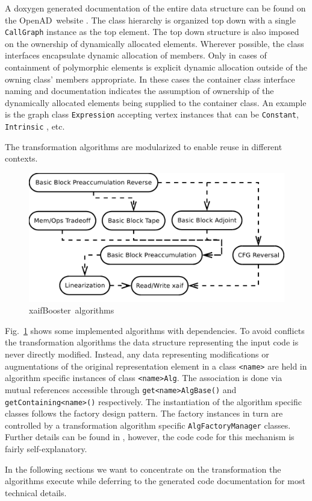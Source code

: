 \documentclass{book}
\newcommand{\OpenAD}{OpenAD}
\newcommand{\xaifBooster}{xaifBooster}
\newcommand{\code}[1]{{\small\tt{#1}}}
\newcommand{\reffig}[1]{{Fig.~\ref{#1}}}
\begin{document}
A doxygen generated documentation of the entire data structure 
can be found on the \OpenAD\ website \cite{openadWeb}.
The class hierarchy is organized top down with 
a single \code{CallGraph} instance as the top element. 
The top down structure is also imposed on the ownership of dynamically 
allocated elements. 
Wherever possible, the class interfaces encapsulate dynamic 
allocation of members.  
Only in cases of containment of polymorphic elements is explicit dynamic allocation 
outside of the owning class' members appropriate. 
In these cases the container class interface naming and documentation 
indicates the assumption of ownership of 
the dynamically allocated elements being supplied to the container class. 
An example is the graph class \code{Expression} accepting vertex instances that can be 
\code{Constant}, \code{Intrinsic} , etc.

The transformation algorithms are modularized to enable reuse in different 
contexts. 
\begin{figure}
  \centering \includegraphics[width=.45\textwidth]{allAlgs}
  \caption{\xaifBooster\ algorithms} \label{fig:allAlgs}
\end{figure}
\reffig{fig:allAlgs} shows some implemented algorithms with dependencies.
To avoid conflicts the transformation algorithms the data structure representing the input code  
is never directly modified. 
Instead, any data representing modifications or augmentations of the 
original representation element in a class \code{<name>}
are held in algorithm specific instances of class \code{<name>Alg}.
The association is done via mutual references accessible 
through \code{get<name>AlgBase()} and \code{getContaining<name>()} respectively.
The instantiation of the algorithm specific classes follows 
the factory design pattern. The factory instances in turn are controlled 
by a transformation algorithm specific \code{AlgFactoryManager} classes. 
Further details can be found in \cite{UtNa03STI}, however, the code 
code for this mechanism is fairly self-explanatory.  

In the following sections we want to concentrate on the transformation 
the algorithms execute while deferring to the generated code 
documentation for most technical details.
\end{document}
